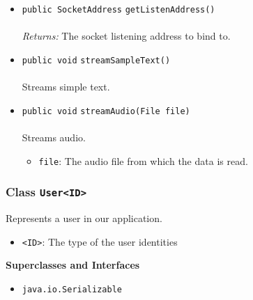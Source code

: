 \begin{itemize}
\item \lstinline|public SocketAddress| \lstinline|getListenAddress|\lstinline|()|\\ \\[-0.6em]
\emph{Returns:} The socket listening address to bind to.



\item \lstinline|public void| \lstinline|streamSampleText|\lstinline|()|\\ \\[-0.6em]
Streams simple text.



\item \lstinline|public void| \lstinline|streamAudio|\lstinline|(File file)|\\ \\[-0.6em]
Streams audio.
\begin{itemize}
\item \lstinline|file|: The audio file from which the data is read.
\end{itemize}



\end{itemize}

\subsubsection{Class \lstinline|User<ID>|}
Represents a user in our application. \\
\noindent\begin{minipage}[t]{5cm}
\vspace{0.3em}
\hspace*{2em}
\vspace{0.3em}
\end{minipage}

\begin{itemize}
\item \lstinline|<ID>|: The type of the user identities
\end{itemize}


\textbf{\sffamily Superclasses and Interfaces}
\begin{itemize}
\item \lstinline|java.io.Serializable|
\end{itemize}


